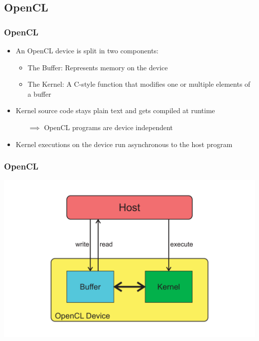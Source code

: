 \documentclass{beamer}
\begin{document}
\subsection{OpenCL}
\begin{frame}
    \frametitle{OpenCL}
    \begin{itemize}
        \item An OpenCL device is split in two components:
        \begin{itemize}
            \item The \alert{Buffer}: Represents memory on the device
            \item The \alert{Kernel}: A C-style function that modifies one or multiple
                                      elements of a buffer
        \end{itemize}
        \item Kernel source code stays plain text and gets compiled at \alert{runtime}
        \begin{itemize}
            \item[$\implies$] OpenCL programs are device independent
        \end{itemize}
        \item Kernel executions on the device run asynchronous to the host program
    \end{itemize}
\end{frame}
\begin{frame}
    \frametitle{OpenCL}
    \begin{center}
        \includegraphics[width=\textwidth]{../2014-09-25_gputalk/opencl_overview.pdf}
    \end{center}
\end{frame}
\end{document}
